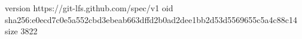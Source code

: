 version https://git-lfs.github.com/spec/v1
oid sha256:e0ecd7c0e5a552cbd3ebeab663dffd2b0ad2dee1bb2d53d5569655c5a4c88c14
size 3822
